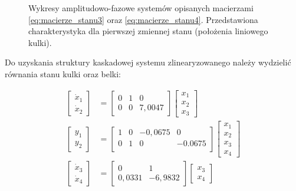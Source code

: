 \begin{figure}[ht]
    \centering
    
    \caption{Wykresy amplitudowo-fazowe systemów opisanych macierzami \eqref{eq:macierze_stanu3} oraz \eqref{eq:macierze_stanu4}. Przedstawiona charakterystyka dla pierwszej zmiennej stanu (położenia linio\-wego kulki).}
    \label{fig:charakterystyka_amplitudowo_fazowa}
\end{figure}

Do uzyskania struktury kaskadowej systemu zlinearyzowanego należy wydzielić równania stanu kulki oraz belki:

\begin{align}
\begin{bmatrix}
\dot{x}_1 \\ \dot{x}_2
\end{bmatrix}
&= \begin{bmatrix}
    0 & 1 & 0 \\
    0 & 0 & 7,0047
\end{bmatrix}
\begin{bmatrix}
    x_1 \\ x_2 \\ x_3
\end{bmatrix} \label{eq:rownania_stanu_kulki} \\
\begin{bmatrix}
    y_1 \\ y_2
\end{bmatrix}
&= \begin{bmatrix}
    1 & 0 & -0,0675 & 0 \\
    0 & 1 & 0 & -0.0675 \\
\end{bmatrix}
\begin{bmatrix}
x_1 \\ x_2 \\ x_3 \\ x_4
\end{bmatrix} \label{eq:rownania_wyjscia_kulki} \\
\begin{bmatrix}
    \dot{x}_3 \\ \dot{x}_4
\end{bmatrix}
&= \begin{bmatrix}
    0 & 1 \\
    0,0331 & -6,9832
\end{bmatrix}
\begin{bmatrix}
    x_3 \\ x_4
\end{bmatrix}

\end{align}
